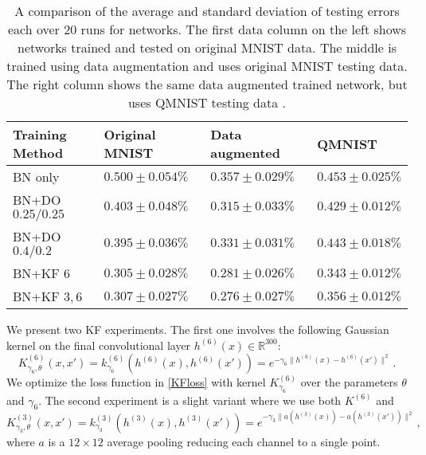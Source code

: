 \documentclass[11pt]{article}
\def\R{\mathbb{R}}
\begin{document}
\begin{table}[h]
\begin{center}
\begin{tabular}{ | p{3.2cm} || p{3.2cm} | p{3.2cm} | p{3.2cm}|}
\hline
\textbf{Training Method} & \textbf{Original MNIST} & \textbf{Data augmented} & \textbf{QMNIST}\\
\hline
BN only & $0.500 \pm 0.054\%$ & $0.357 \pm 0.029\%$ & $0.453 \pm 0.025\%$\\
\hline
BN+DO $0.25/0.25$ & $0.403 \pm 0.048\%$ & $0.315 \pm 0.033\%$ & $0.429 \pm 0.012\%$ \\
\hline
BN+DO $0.4/0.2$ & $0.395 \pm 0.036\%$ & $0.331 \pm 0.031\%$ & $0.443 \pm 0.018\%$\\
\hline
BN+KF $6$ & $0.305 \pm 0.028\%$ & $0.281 \pm 0.026\%$ & $0.343 \pm 0.012\%$ \\
\hline
BN+KF $3,6$ & $0.307 \pm 0.027\%$ & $0.276 \pm 0.027\%$ & $0.356 \pm 0.012\%$ \\
\hline
\end{tabular}
\end{center}
\caption{A comparison of the average and standard deviation of testing errors each over 20 runs for networks.  The first data column on the left shows networks trained and tested on original MNIST data.  The middle is trained using data augmentation and uses original MNIST testing data.  The right column shows the same data augmented trained network, but uses QMNIST testing data \cite{qmnist}. }\label{KFvsDO}
\end{table}

We present two KF experiments.  The first one involves the following Gaussian kernel on the final convolutional layer $h^{(6)}(x) \in \R^{300}$:
\begin{equation}
    K^{(6)}_{\gamma_6,\theta}(x, x') = k^{(6)}_{\gamma_6} (h^{(6)}(x), h^{(6)}(x')) = e^{-\gamma_6 \| h^{(6)}(x) - h^{(6)}(x') \|^2}\, .
\end{equation}
We optimize the loss function in \eqref{KFloss} with kernel $K^{(6)}_{\gamma_6}$ over the parameters $\theta$ and $\gamma_6$.  The second experiment is a slight variant where we use both $K^{(6)}$ and
\begin{equation}
    K^{(3)}_{\gamma_3,\theta}(x, x') = k^{(3)}_{\gamma_3} (h^{(3)}(x), h^{(3)}(x')) = e^{-\gamma_3 \| a(h^{(3)}(x)) - a(h^{(3)}(x')) \|^2}\, ,
\end{equation}
where $a$ is a $12 \times 12$ average pooling reducing each channel to a single point.
\end{document}
